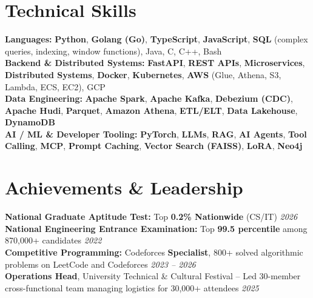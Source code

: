 \documentclass[10pt]{article}
\begin{document}
\section*{Technical Skills}
\textbf{Languages:} \textbf{Python}, \textbf{Golang (Go)}, \textbf{TypeScript}, \textbf{JavaScript}, \textbf{SQL} (complex queries, indexing, window functions), Java, C, C++, Bash \\
\textbf{Backend \& Distributed Systems:} \textbf{FastAPI}, \textbf{REST APIs}, \textbf{Microservices}, \textbf{Distributed Systems}, \textbf{Docker}, \textbf{Kubernetes}, \textbf{AWS} (Glue, Athena, S3, Lambda, ECS, EC2), GCP \\
\textbf{Data Engineering:} \textbf{Apache Spark}, \textbf{Apache Kafka}, \textbf{Debezium (CDC)}, \textbf{Apache Hudi}, \textbf{Parquet}, \textbf{Amazon Athena}, \textbf{ETL/ELT}, \textbf{Data Lakehouse}, \textbf{DynamoDB} \\
\textbf{AI / ML \& Developer Tooling:} \textbf{PyTorch}, \textbf{LLMs}, \textbf{RAG}, \textbf{AI Agents}, \textbf{Tool Calling}, \textbf{MCP}, \textbf{Prompt Caching}, \textbf{Vector Search (FAISS)}, \textbf{LoRA}, \textbf{Neo4j}
\vspace{-0.35em}

\section*{Achievements \& Leadership}
\textbf{National Graduate Aptitude Test:} Top \textbf{0.2\% Nationwide} (CS/IT) \hfill \textit{2026} \\[0.1em]
\textbf{National Engineering Entrance Examination:} Top \textbf{99.5 percentile} among 870,000+ candidates \hfill \textit{2022} \\[0.1em]
\textbf{Competitive Programming:} Codeforces \textbf{Specialist}, 800+ solved algorithmic problems on LeetCode and Codeforces \hfill \textit{2023 -- 2026} \\[0.1em]
\textbf{Operations Head}, University Technical & Cultural Festival -- Led 30-member cross-functional team managing logistics for 30,000+ attendees \hfill \textit{2025}
\end{document}
